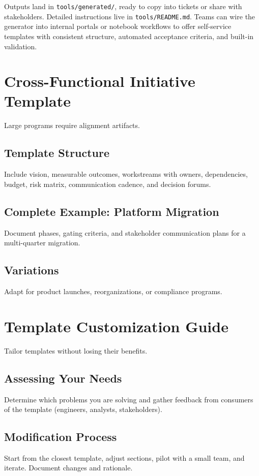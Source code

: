 Outputs land in \texttt{tools/generated/}, ready to copy into tickets or share with stakeholders. Detailed instructions live in \texttt{tools/README.md}. Teams can wire the generator into internal portals or notebook workflows to offer self-service templates with consistent structure, automated acceptance criteria, and built-in validation.

\section{Cross-Functional Initiative Template}
\label{sec:initiative-template}

Large programs require alignment artifacts.

\subsection{Template Structure}
Include vision, measurable outcomes, workstreams with owners, dependencies, budget, risk matrix, communication cadence, and decision forums.

\subsection{Complete Example: Platform Migration}
Document phases, gating criteria, and stakeholder communication plans for a multi-quarter migration.

\subsection{Variations}
Adapt for product launches, reorganizations, or compliance programs.

\section{Template Customization Guide}
\label{sec:customization}

Tailor templates without losing their benefits.

\subsection{Assessing Your Needs}
Determine which problems you are solving and gather feedback from consumers of the template (engineers, analysts, stakeholders).

\subsection{Modification Process}
Start from the closest template, adjust sections, pilot with a small team, and iterate. Document changes and rationale.

